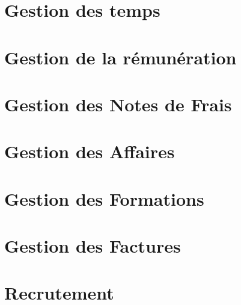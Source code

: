 \documentclass[12pt]{scrreprt}
\begin{document}

\chapter{Gestion des temps}



\chapter{Gestion de la rémunération}

\chapter{Gestion des Notes de Frais}


\chapter{Gestion des Affaires}


\chapter{Gestion des Formations}


\chapter{Gestion des Factures}

\chapter{Recrutement}

% 
\end{document}
